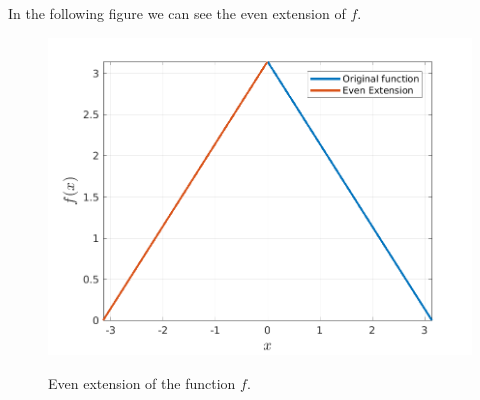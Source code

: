 \begin{questions}

\begin{solution}
In the following figure we can see the even extension of $f$. 

\begin{figure}[H]
\centering     %
{\includegraphics[scale=0.5]{evenExtension.png}}
\caption{Even extension of the function $f$.}
\end{figure}


\end{solution}
\end{questions}

